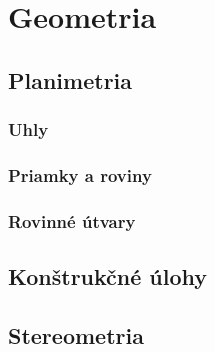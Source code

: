 \chapter{Geometria}
\label{chap:geometria}

\section{Planimetria}

\subsection{Uhly}

\subsection{Priamky a roviny}

\subsection{Rovinné útvary}

\newpage

\section{Konštrukčné úlohy}

\newpage

\section{Stereometria}
